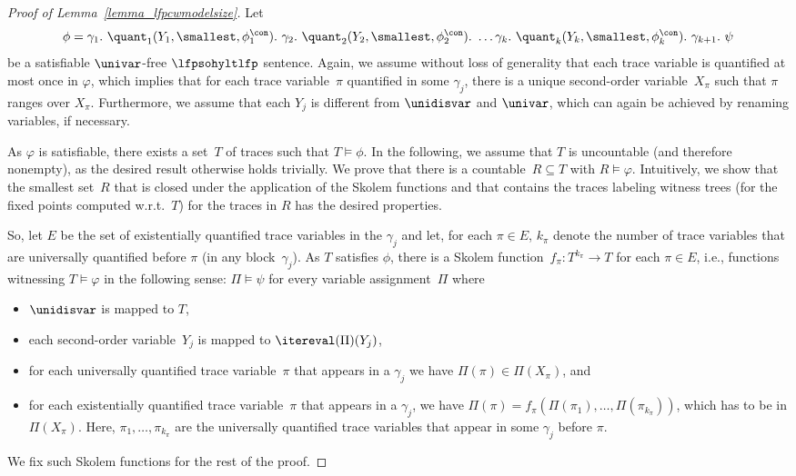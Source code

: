 \begin{proof}[Proof of Lemma~\ref{lemma_lfpcwmodelsize}]
Let \[
\phi = 
\gamma_1.\ \quant_1(Y_1, \smallest, \phi_1^\con).\ 
\gamma_2.\ \quant_2(Y_2, \smallest, \phi_2^\con).\ 
\ldots 
\gamma_k.\ \quant_k(Y_k, \smallest, \phi_k^\con).\
\gamma_{k+1}.\
\psi
\]
be a satisfiable $\univar$-free $\lfpsohyltlfp$ sentence.
Again, we assume without loss of generality that each trace variable is quantified at most once in $\varphi$, which implies that for each trace variable~$\pi$ quantified in some $\gamma_j$, there is a unique second-order variable~$X_\pi$ such that $\pi$ ranges over $X_\pi$.
Furthermore, we assume that each $Y_j$ is different from $\unidisvar$ and $\univar$, which can again be achieved by renaming variables, if necessary.

As $\varphi$ is satisfiable, there exists a set~$T$ of traces such that $T \models\phi$. 
In the following, we assume that $T$ is uncountable (and therefore nonempty), as the desired result otherwise holds trivially.
We prove that there is a countable~$R \subseteq T$ with $R\models\varphi$.
Intuitively, we show that the smallest set~$R$ that is closed under the application of the Skolem functions and that contains the traces labeling witness trees (for the fixed points computed w.r.t.\ $T$) for the traces in $R$ has the desired properties.

So, let $E$ be the set of existentially quantified trace variables in the $\gamma_j$ and let, for each $\pi \in E$, $k_\pi$ denote the number of trace variables that are universally quantified before $\pi$ (in any block~$\gamma_j$).
As $T$ satisfies $\phi$, there is a Skolem function~$f_{\pi} \colon T^{k_\pi} \rightarrow T$ for each  $\pi \in E$, i.e., functions witnessing $T\models \varphi$ in the following sense: $\Pi\models\psi$ for every variable assignment~$\Pi$ where 
\begin{itemize}
    \item $\unidisvar$ is mapped to $T$,
    \item each second-order variable~$Y_j$ is mapped to $\itereval(\Pi)(Y_j)$,
    \item for each universally quantified trace variable~$\pi$ that appears in a $\gamma_j$ we have $\Pi(\pi) \in \Pi(X_\pi)$, and
    \item for each existentially quantified trace variable~$\pi$ that appears in a $\gamma_j$, we have $\Pi(\pi) = f_{\pi}(\Pi(\pi_1), \ldots, \Pi(\pi_{k_\pi}))$, which has to be in $\Pi(X_\pi)$. Here, $\pi_1, \ldots, \pi_{k_\pi}$ are the universally quantified trace variables  that appear in some $\gamma_j$ before $\pi$.
\end{itemize}
We fix such Skolem functions for the rest of the proof. 


\end{proof}
